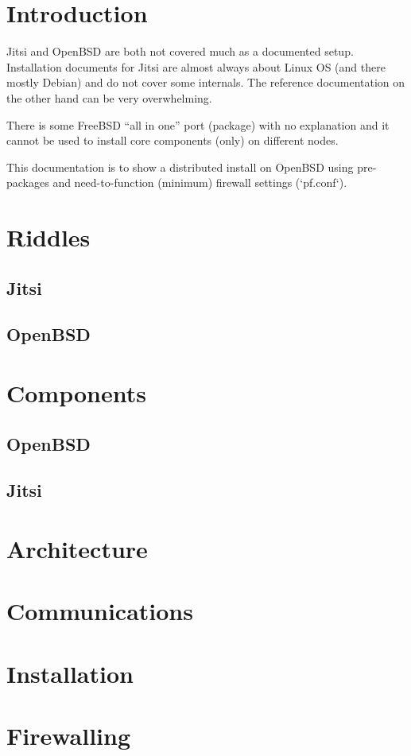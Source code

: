 \documentclass[conference]{IEEEtran}
\begin{document}
\section{Introduction}
Jitsi and OpenBSD are both not covered much as a documented setup. Installation documents
for Jitsi are almost always about Linux OS (and there mostly Debian) and do not cover
some internals. The reference documentation on the other hand can be very overwhelming.

There is some FreeBSD ``all in one'' port (package) with no explanation and it cannot be
used to install core components (only) on different nodes.

This documentation is to show a distributed install on OpenBSD using pre-packages and
need-to-function (minimum) firewall settings (`pf.conf`).

\section{Riddles}
\subsection{Jitsi}
\subsection{OpenBSD}

\section{Components}
\subsection{OpenBSD}
\subsection{Jitsi}
\section{Architecture}
\section{Communications}
\section{Installation}
\section{Firewalling}
\end{document}
